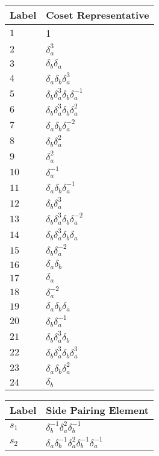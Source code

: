 \documentclass{article}
\begin{document}

\begin{center}
\begin{tabular}{ll}
\toprule
Label & Coset Representative\\
\midrule
$1$ & 1 \\
$2$ & $\delta_a^{3}$ \\
$3$ & $\delta_b^{}\delta_a^{}$ \\
$4$ & $\delta_a^{}\delta_b^{}\delta_a^{3}$ \\
$5$ & $\delta_b^{}\delta_a^{3}\delta_b^{}\delta_a^{-1}$ \\
$6$ & $\delta_b^{}\delta_a^{3}\delta_b^{}\delta_a^{2}$ \\
$7$ & $\delta_a^{}\delta_b^{}\delta_a^{-2}$ \\
$8$ & $\delta_b^{}\delta_a^{2}$ \\
$9$ & $\delta_a^{2}$ \\
$10$ & $\delta_a^{-1}$ \\
$11$ & $\delta_a^{}\delta_b^{}\delta_a^{-1}$ \\
$12$ & $\delta_b^{}\delta_a^{3}$ \\
$13$ & $\delta_b^{}\delta_a^{3}\delta_b^{}\delta_a^{-2}$ \\
$14$ & $\delta_b^{}\delta_a^{3}\delta_b^{}\delta_a^{}$ \\
$15$ & $\delta_b^{}\delta_a^{-2}$ \\
$16$ & $\delta_a^{}\delta_b^{}$ \\
$17$ & $\delta_a^{}$ \\
$18$ & $\delta_a^{-2}$ \\
$19$ & $\delta_a^{}\delta_b^{}\delta_a^{}$ \\
$20$ & $\delta_b^{}\delta_a^{-1}$ \\
$21$ & $\delta_b^{}\delta_a^{3}\delta_b^{}$ \\
$22$ & $\delta_b^{}\delta_a^{3}\delta_b^{}\delta_a^{3}$ \\
$23$ & $\delta_a^{}\delta_b^{}\delta_a^{2}$ \\
$24$ & $\delta_b^{}$ \\
\bottomrule
\end{tabular}
\hfill
\begin{tabular}{ll}
\toprule
Label & Side Pairing Element\\
\midrule
$s_{1}$ & $\delta_b^{-1}\delta_a^{2}\delta_b^{-1}$ \\
$s_{2}$ & $\delta_a^{}\delta_b^{-1}\delta_a^{2}\delta_b^{-1}\delta_a^{-1}$ \\

\end{tabular}
\end{center}
\end{document}
